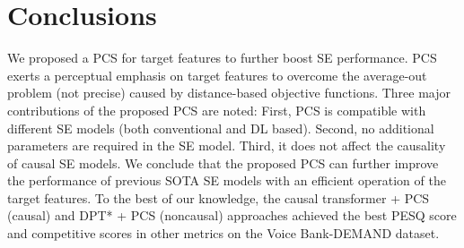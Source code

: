 \documentclass[a4paper]{article}
\begin{document}
\section{Conclusions}
\label{sec:conclusion}
We proposed a PCS for target features to further boost SE performance. PCS exerts a perceptual emphasis on target features to overcome the average-out problem (not precise) caused by distance-based objective functions. Three major contributions of the proposed PCS are noted: First, PCS is compatible with different SE models (both conventional and DL based). Second, no additional parameters are required in the SE model. Third, it does not affect the causality of causal SE models. We conclude that the proposed PCS can further improve the performance of previous SOTA SE models with an efficient operation of the target features. 
To the best of our knowledge, the causal transformer + PCS (causal) and DPT* + PCS (noncausal) approaches achieved the best PESQ score and competitive scores in other metrics on the Voice Bank-DEMAND dataset.








\newpage






\end{document}
